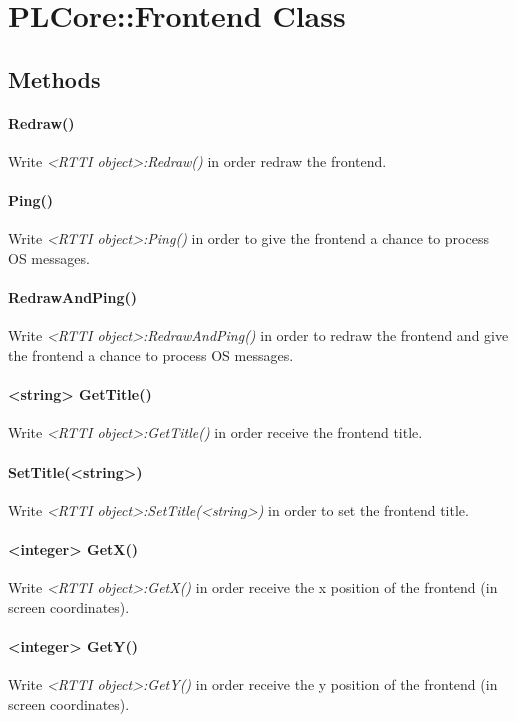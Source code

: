 \section{PLCore::Frontend Class}


\subsection{Methods}

\paragraph{Redraw()}
Write \emph{<RTTI object>:Redraw()} in order redraw the frontend.

\paragraph{Ping()}
Write \emph{<RTTI object>:Ping()} in order to give the frontend a chance to process \ac{OS} messages.

\paragraph{RedrawAndPing()}
Write \emph{<RTTI object>:RedrawAndPing()} in order to redraw the frontend and give the frontend a chance to process \ac{OS} messages.

\paragraph{<string> GetTitle()}
Write \emph{<RTTI object>:GetTitle()} in order receive the frontend title.

\paragraph{SetTitle(<string>)}
Write \emph{<RTTI object>:SetTitle(<string>)} in order to set the frontend title.

\paragraph{<integer> GetX()}
Write \emph{<RTTI object>:GetX()} in order receive the x position of the frontend (in screen coordinates).

\paragraph{<integer> GetY()}
Write \emph{<RTTI object>:GetY()} in order receive the y position of the frontend (in screen coordinates).

